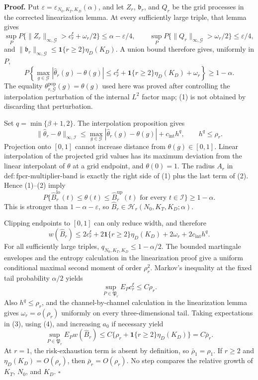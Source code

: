 \textbf{Proof.}
Put \(\varepsilon=\varepsilon_{N_0,K_T,K_D}(\alpha)\), and let \(Z_r\), \(\mathfrak b_r\), and \(Q_r\) be the grid processes in the corrected linearization lemma. At every sufficiently large triple, that lemma gives
\[
 \sup_P P\{\|Z_r\|_{\infty,\mathcal G}>c_r^\xi+\omega_r/2\}
 \le\alpha-\varepsilon/4,
 \qquad
 \sup_P P\{\|Q_r\|_{\infty,\mathcal G}>\omega_r/2\}
 \le\varepsilon/4,
\]
and \(\|\mathfrak b_r\|_{\infty,\mathcal G}\le\mathbf 1\{r\ge2\}\eta_D(K_D)\). A union bound therefore gives, uniformly in \(P\),
\[
 P\!\left\{
 \max_{g\in\mathcal G}|\widehat\theta_r(g)-\theta(g)|
 \le c_r^\xi+\mathbf 1\{r\ge2\}\eta_D(K_D)+\omega_r
 \right\}\ge1-\alpha. \tag{1}
\]
The equality \(\theta^{\mathrm{pop}}_{r,\mathcal G}(g)=\theta(g)\) used here was proved after controlling the interpolation perturbation of the internal \(L^2\) factor map; (1) is not obtained by discarding that perturbation.

Set \(q=\min\{\beta+1,2\}\). The interpolation proposition gives
\[
 \|\widehat\theta_r-\theta\|_{\infty,\mathcal I}
 \le\max_{g\in\mathcal G}|\widehat\theta_r(g)-\theta(g)|
 +c_{\mathrm{int}}h^q,
 \qquad h^q\le\rho_r. \tag{2}
\]
Projection onto \([0,1]\) cannot increase distance from \(\theta(g)\in[0,1]\). Linear interpolation of the projected grid values has its maximum deviation from the linear interpolant of \(\theta\) at a grid endpoint, and \(\theta(0)=1\). The radius \(A_r\) in \(\mathrm{def:fpcr\mbox{-}multiplier\mbox{-}band}\) is exactly the right side of (1) plus the last term of (2). Hence (1)--(2) imply
\[
 P\{\widehat B_r^{\mathrm{lo}}(t)\le\theta(t)\le
 \widehat B_r^{\mathrm{up}}(t)\text{ for every }t\in\mathcal I\}
 \ge1-\alpha.
\]
This is stronger than \(1-\alpha-\varepsilon\), so \(\widehat B_r\in\mathcal H_r(N_0,K_T,K_D;\alpha)\).

Clipping endpoints to \([0,1]\) can only reduce width, and therefore
\[
 w(\widehat B_r)
 \le2c_r^\xi+2\mathbf 1\{r\ge2\}\eta_D(K_D)
 +2\omega_r+2c_{\mathrm{int}}h^q. \tag{3}
\]
For all sufficiently large triples, \(q_{N_0,K_T,K_D}\le1-\alpha/2\). The bounded martingale envelopes and the entropy calculation in the linearization proof give a uniform conditional maximal second moment of order \(\rho_r^2\). Markov's inequality at the fixed tail probability \(\alpha/2\) yields
\[
 \sup_{P\in\mathfrak P_r}E_Pc_r^\xi\le C\rho_r. \tag{4}
\]
Also \(h^q\le\rho_r\), and the channel-by-channel calculation in the linearization lemma gives \(\omega_r=o(\rho_r)\) uniformly on every three-dimensional tail. Taking expectations in (3), using (4), and increasing \(a_0\) if necessary yield
\[
 \sup_{P\in\mathfrak P_r}E_Pw(\widehat B_r)
 \le C\{\rho_r+\mathbf 1\{r\ge2\}\eta_D(K_D)\}
 =C\bar\rho_r. \tag{5}
\]
At \(r=1\), the risk-exhaustion term is absent by definition, so \(\bar\rho_1=\rho_1\). If \(r\ge2\) and \(\eta_D(K_D)=O(\rho_r)\), then \(\bar\rho_r=O(\rho_r)\). No step compares the relative growth of \(K_T\), \(N_0\), and \(K_D\). \(\square\)